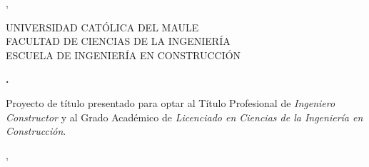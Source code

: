 \begin{center}

\end{center}
\vfill

\begin{center}
\Large{\mes, \yeaR}
\end{center}

\thispagestyle{empty}

\newpage
\begin{center}

{\renewcommand{\baselinestretch}{1}
\LARGE{UNIVERSIDAD CATÓLICA DEL MAULE}\\\Large{FACULTAD DE CIENCIAS DE LA INGENIERÍA\\ESCUELA DE INGENIERÍA EN CONSTRUCCIÓN}

}

\vspace{55mm}

\Large{\textbf{\titulo.}}
\vspace{20mm}


\Large{\textbf{\alumnos}}
\vspace{20mm}

\large{Proyecto de título presentado para optar al Título Profesional de \textit{Ingeniero Constructor} y al Grado Académico de  \textit{Licenciado en Ciencias de la Ingeniería en Construcción}.}

\end{center}
\vspace{14mm}

\begin{center}

\large{\begin{flushright}
\profguia

\coguia

\end{flushright}
}
\end{center}

\vfill

\begin{center}
\Large{\mes, \yeaR}
\end{center}

\thispagestyle{empty}

\newpage

\setcounter{page}{2}

